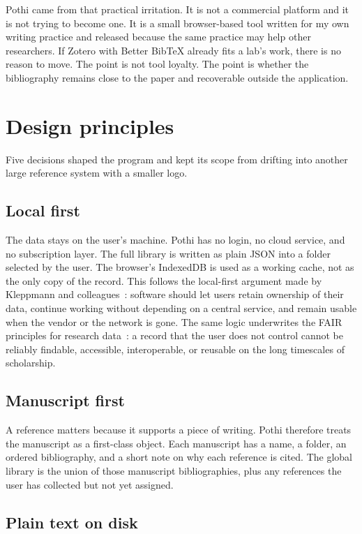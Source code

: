 \documentclass[10pt,twocolumn]{article}
\begin{document}
Pothi came from that practical irritation. It is not a commercial platform and it is not trying to become one. It is a small browser-based tool written for my own writing practice and released because the same practice may help other researchers. If Zotero with Better BibTeX already fits a lab's work, there is no reason to move. The point is not tool loyalty. The point is whether the bibliography remains close to the paper and recoverable outside the application.

\section{Design principles}

Five decisions shaped the program and kept its scope from drifting into another large reference system with a smaller logo.

\subsection{Local first}

The data stays on the user's machine. Pothi has no login, no cloud service, and no subscription layer. The full library is written as plain JSON into a folder selected by the user. The browser's IndexedDB is used as a working cache, not as the only copy of the record. This follows the local-first argument made by Kleppmann and colleagues~\cite{Kleppmann2019LocalFirst}: software should let users retain ownership of their data, continue working without depending on a central service, and remain usable when the vendor or the network is gone. The same logic underwrites the FAIR principles for research data~\cite{Wilkinson2016FAIR}: a record that the user does not control cannot be reliably findable, accessible, interoperable, or reusable on the long timescales of scholarship.

\subsection{Manuscript first}

A reference matters because it supports a piece of writing. Pothi therefore treats the manuscript as a first-class object. Each manuscript has a name, a folder, an ordered bibliography, and a short note on why each reference is cited. The global library is the union of those manuscript bibliographies, plus any references the user has collected but not yet assigned.

\subsection{Plain text on disk}
\end{document}

